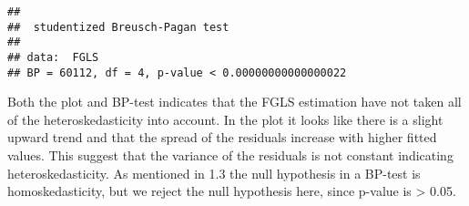 \documentclass[
]{article}
\begin{document}
\begin{verbatim}
## 
##  studentized Breusch-Pagan test
## 
## data:  FGLS
## BP = 60112, df = 4, p-value < 0.00000000000000022
\end{verbatim}

Both the plot and BP-test indicates that the FGLS estimation have not
taken all of the heteroskedasticity into account. In the plot it looks
like there is a slight upward trend and that the spread of the residuals
increase with higher fitted values. This suggest that the variance of
the residuals is not constant indicating heteroskedasticity. As
mentioned in 1.3 the null hypothesis in a BP-test is homoskedasticity,
but we reject the null hypothesis here, since p-value is \textgreater{}
0.05.
\end{document}
